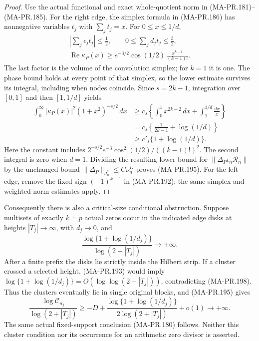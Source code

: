 \begin{proof}
Use the actual functional and exact whole-quotient
norm in (MA-PR.181)--(MA-PR.185).  For the right
edge, the simplex formula in (MA-PR.186) has
nonnegative variables \(t_j\) with
\(\sum_jt_j=x\).  For \(0\le x\le1/d\),
\[
 \begin{gathered}
 \left|\sum_j\epsilon_jt_j\right|\le\tfrac12,
 \qquad
       0\le\sum_jd_jt_j\le\tfrac32,\\
 \operatorname{Re}\kappa_P(x)
       \ge e^{-3/2}\cos(1/2)\,
                           \frac{x^{k-1}}{(k-1)!}.
 \end{gathered}
 \tag{MA-PR.196}
\]
The last factor is the volume of the convolution
simplex; for \(k=1\) it is one.  The phase bound
holds at every point of that simplex, so the
lower estimate survives its integral, including
when nodes coincide.  Since \(s=2k-1\), integration
over \([0,1]\) and then \([1,1/d]\) yields
\[
 \begin{split}
 \int_0^\infty|\kappa_P(x)|^2(1+x^2)^{-s/2}\,dx
   &\ge c_s\left\{
          \int_0^1x^{2k-2}\,dx+
                          \int_1^{1/d}\frac{dx}{x}\right\}\\
   &=c_s\left\{\frac1{2k-1}+\log(1/d)\right\}\\
   &\ge c'_s\{1+\log(1/d)\}.
 \end{split}
 \tag{MA-PR.197}
\]
Here the constant includes
\(2^{-s/2}e^{-3}\cos^2(1/2)/((k-1)!)^2\).
The second integral is zero when \(d=1\).
Dividing the resulting lower bound for
\(\|\Delta_P\iota_n\mathscr R_n\|\) by the
unchanged bound
\(\|\Delta_P\|_{J_n^*}\le C\nu_n^D\) proves
(MA-PR.195).  For the left edge, remove the fixed
sign \((-1)^{k-1}\) in (MA-PR.192); the same
simplex and weighted-norm estimates apply.
\end{proof}

Consequently there is also a critical-size
conditional obstruction.  Suppose multisets of
exactly \(k=p\) actual zeros occur in the indicated
edge disks at heights \(|T_j|\to\infty\), with
\(d_j\to0\), and
\[
       \frac{\log\{1+\log(1/d_j)\}}
                    {\log(2+|T_j|)}
                            \longrightarrow+\infty.
 \tag{MA-PR.198}
\]
After a finite prefix the disks lie strictly
inside the Hilbert strip.  If a cluster crossed
a selected height, (MA-PR.193) would imply
\(\log\{1+\log(1/d_j)\}=O(\log\log(2+|T_j|))\),
contradicting (MA-PR.198).  Thus the clusters
eventually lie in single original blocks, and
(MA-PR.195) gives
\[
 \frac{\log\mathcal C_{n_j}}{\log(2+|T_j|)}
 \ge -D+
       \frac{\log\{1+\log(1/d_j)\}}
                   {2\log(2+|T_j|)}+o(1)
                      \longrightarrow+\infty.
 \tag{MA-PR.199}
\]
The same actual fixed-support conclusion
(MA-PR.180) follows.  Neither this cluster
condition nor its occurrence for an arithmetic
zero divisor is asserted.


